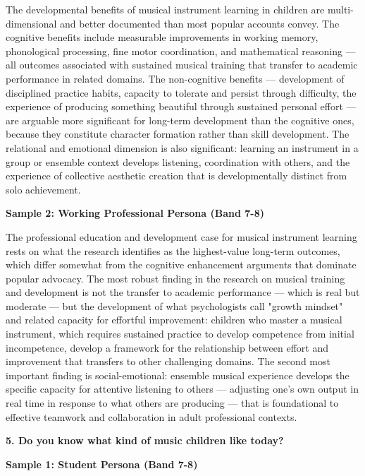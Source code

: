The developmental benefits of musical instrument learning in children are multi-dimensional and better documented than most popular accounts convey. The cognitive benefits include measurable improvements in working memory, phonological processing, fine motor coordination, and mathematical reasoning — all outcomes associated with sustained musical training that transfer to academic performance in related domains. The non-cognitive benefits — development of disciplined practice habits, capacity to tolerate and persist through difficulty, the experience of producing something beautiful through sustained personal effort — are arguable more significant for long-term development than the cognitive ones, because they constitute character formation rather than skill development. The relational and emotional dimension is also significant: learning an instrument in a group or ensemble context develops listening, coordination with others, and the experience of collective aesthetic creation that is developmentally distinct from solo achievement.

\textbf{Sample 2: Working Professional Persona (Band 7-8)}

The professional education and development case for musical instrument learning rests on what the research identifies as the highest-value long-term outcomes, which differ somewhat from the cognitive enhancement arguments that dominate popular advocacy. The most robust finding in the research on musical training and development is not the transfer to academic performance — which is real but moderate — but the development of what psychologists call "growth mindset" and related capacity for effortful improvement: children who master a musical instrument, which requires sustained practice to develop competence from initial incompetence, develop a framework for the relationship between effort and improvement that transfers to other challenging domains. The second most important finding is social-emotional: ensemble musical experience develops the specific capacity for attentive listening to others — adjusting one's own output in real time in response to what others are producing — that is foundational to effective teamwork and collaboration in adult professional contexts.

\separator

\begin{ieltsquestion}
\textbf{5. Do you know what kind of music children like today?}
\end{ieltsquestion}
\textbf{Sample 1: Student Persona (Band 7-8)}

